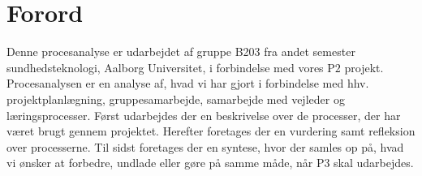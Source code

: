 \chapter{Forord}
Denne procesanalyse er udarbejdet af gruppe B203 fra andet semester sundhedsteknologi, Aalborg Universitet, i forbindelse med vores P$2$ projekt.
Procesanalysen er en analyse af, hvad vi har gjort i forbindelse med hhv. projektplanlægning, gruppesamarbejde, samarbejde med vejleder og læringsprocesser. Først udarbejdes der en beskrivelse over de processer, der har været brugt gennem projektet. Herefter foretages der en vurdering samt refleksion over processerne. Til sidst foretages der en syntese, hvor der samles op på, hvad vi ønsker at forbedre, undlade eller gøre på samme måde, når P$3$ skal udarbejdes.